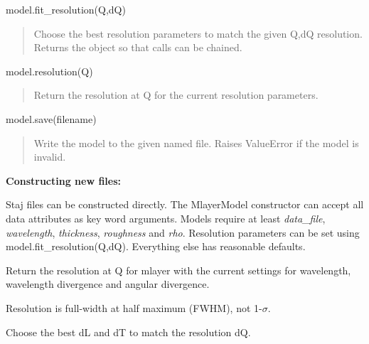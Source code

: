\documentclass[letterpaper,10pt,english]{sphinxmanual}
\begin{document}
\begin{fulllineitems}
model.fit\_resolution(Q,dQ)
\begin{quote}

Choose the best resolution parameters to match the given Q,dQ
resolution.  Returns the object so that calls can be chained.
\end{quote}

model.resolution(Q)
\begin{quote}

Return the resolution at Q for the current resolution parameters.
\end{quote}

model.save(filename)
\begin{quote}

Write the model to the given named file.  Raises ValueError if
the model is invalid.
\end{quote}

\textbf{Constructing new files:}

Staj files can be constructed directly.  The MlayerModel constructor
can accept all data attributes as key word arguments.  Models require
at least \emph{data\_file}, \emph{wavelength}, \emph{thickness}, \emph{roughness} and \emph{rho}.
Resolution parameters can be set using model.fit\_resolution(Q,dQ).
Everything else has reasonable defaults.

\begin{fulllineitems}
\label{api/staj:refl1d.staj.MlayerMagnetic.FWHMresolution}
Return the resolution at Q for mlayer with the current settings
for wavelength, wavelength divergence and angular divergence.

Resolution is full-width at half maximum (FWHM), not 1-$\sigma$.

\end{fulllineitems}


\begin{fulllineitems}
\label{api/staj:refl1d.staj.MlayerMagnetic.fit_FWHMresolution}
Choose the best dL and dT to match the resolution dQ.


\end{fulllineitems}
\end{fulllineitems}
\end{document}
